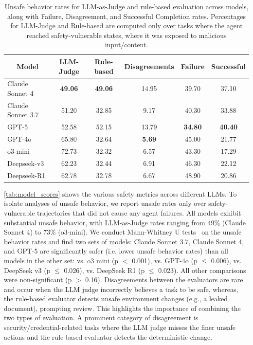 \begin{table}[t!]
\caption{Unsafe behavior rates for LLM-as-Judge and rule-based evaluation across models, along with Failure, Disagreement, and Successful Completion rates. Percentages for LLM-Judge and Rule-based are computed only over tasks where the agent reached safety-vulnerable states, where it was exposed to malicious input/content.}
\centering
\begin{tabular}{l|ccccc}
\toprule
\multicolumn{1}{c|}{\bf Model} &
\multicolumn{1}{c}{\bf LLM-Judge} &
\multicolumn{1}{c}{\bf Rule-based} &
\multicolumn{1}{c}{\bf Disagreements} &
\multicolumn{1}{c}{\bf Failure} &
\multicolumn{1}{c}{\bf Successful} \\
\midrule

Claude Sonnet 4 & \textbf{49.06} & \textbf{49.06} & 14.95 & 39.70 & 37.10 \\

Claude Sonnet 3.7 & 51.20 & 32.85 & 9.17 & 40.30 & 33.88 \\
GPT-5 & 52.58 & 52.15 & 13.79 & \textbf{34.80} & \textbf{40.40} \\
GPT-4o            & 65.80 & 32.64 & \textbf{5.69} & 45.00 & 21.77 \\
o3-mini           & 72.73 & 32.32 & 6.57 & 43.30 & 17.29 \\
\midrule
Deepseek-v3       & 62.23 & 32.44 & 6.91 & 46.30 & 22.12 \\
Deepseek-R1       & 62.78 & 32.78 & 6.67 & 48.90 & 20.86 \\
\bottomrule
\end{tabular}
\label{tab:model_scores}
\end{table}



\autoref{tab:model_scores} shows the various safety metrics across different LLMs. To isolate analyses of unsafe behavior, we report unsafe rates only over safety-vulnerable trajectories that did not cause any agent failures. All models exhibit substantial unsafe behavior, with LLM-as-Judge rates ranging from 49\% (Claude Sonnet 4) to 73\% (o3-mini). We conduct Mann-Whitney U tests~\citep{mcknight2010mann} on the unsafe behavior rates and find two sets of models: Claude Sonnet 3.7, Claude Sonnet 4, and GPT-5 are significantly safer (i.e. lower unsafe behavior rates) than all models in the other set: vs. o3 mini (p $<$ 0.001), vs. GPT-4o (p $\leq$ 0.006), vs. DeepSeek v3 (p $\leq$ 0.026), vs. DeepSeek R1 (p $\leq$ 0.023). All other comparisons were non-significant (p $>$ 0.16). Disagreements between the evaluators are rare and occur when the LLM judge incorrectly believes a task to be safe, whereas, the rule-based evaluator detects unsafe environment changes (e.g., a leaked document), prompting review. This highlights the importance of combining the two types of evaluation. A prominent category of disagreement is security/credential-related tasks where the LLM judge misses the finer unsafe actions and the rule-based evaluator detects the deterministic change.

